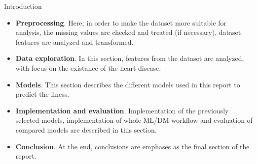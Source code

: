 \documentclass[
  ignorenonframetext,
]{beamer}
\begin{document}
\begin{frame}{Introduction}
\begin{itemize}
\item
  \textbf{Preprocessing}. Here, in order to make the dataset more
  suitable for analysis, the missing values are checked and treated (if
  necessary), dataset features are analyzed and transformed.
\item
  \textbf{Data exploration}. In this section, features from the dataset
  are analyzed, with focus on the existance of the heart disease.
\item
  \textbf{Models}. This section describes the different models used in
  this report to predict the ilness.
\item
  \textbf{Implementation and evaluation}. Implementation of the
  previously selected models, implementation of whole ML/DM workflow and
  evaluation of compared models are described in this section.
\item
  \textbf{Conclusion}. At the end, conclusions are emphases as the final
  section of the report.
\end{itemize}

\end{frame}
\end{document}
